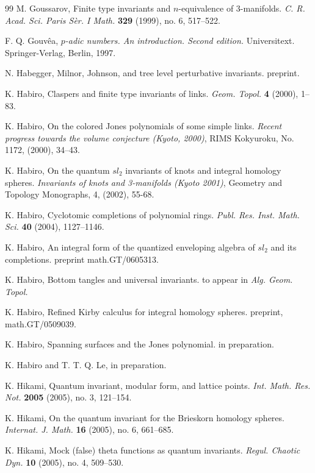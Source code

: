 \documentclass{amsart}
\numberwithin{equation}{section}
\numberwithin{figure}{section}
\theoremstyle{plain}
\theoremstyle{definition}
\theoremstyle{remark}
\begin{document}
\begin{thebibliography}{99}
M. Goussarov,
Finite type invariants and $n$-equivalence of $3$-manifolds.
{\it C. R. Acad. Sci. Paris S\`er. I Math.} {\bf 329} (1999), no. 6, 517--522.

F. Q. Gouv\^ea,
{\it $p$-adic numbers. An introduction. Second edition.}
Universitext. Springer-Verlag, Berlin, 1997.

N. Habegger,
Milnor, Johnson, and tree level perturbative invariants.
preprint.

K. Habiro,
Claspers and finite type invariants of links.
{\it Geom. Topol.} {\bf 4} (2000), 1--83.

K. Habiro,
On the colored Jones polynomials of some simple links.
{\it Recent progress towards the volume conjecture (Kyoto, 2000)},
RIMS Kokyuroku, No. 1172, (2000), 34--43.

K. Habiro,
On the quantum $sl_2$ invariants of knots and integral homology spheres.
{\it Invariants of knots and 3-manifolds (Kyoto 2001)},
Geometry and Topology Monographs, 4, (2002), 55-68.

K. Habiro,
Cyclotomic completions of polynomial rings.
{\it Publ. Res. Inst. Math. Sci.} {\bf 40} (2004), 1127--1146.

K. Habiro,
An integral form of the quantized enveloping algebra of $sl_2$ and its
completions.  preprint math.GT/0605313.
%

K. Habiro,
Bottom tangles and universal invariants.
to appear in {\it Alg. Geom. Topol.}

K. Habiro,
Refined Kirby calculus for integral homology spheres.
preprint, math.GT/0509039.

K. Habiro,
Spanning surfaces and the Jones polynomial.
in preparation.

K. Habiro and T. T. Q. Le,
in preparation.

K. Hikami, Quantum invariant, modular form, and lattice points.
{\it Int. Math. Res. Not.} {\bf 2005} (2005),  no. 3, 121--154.

K. Hikami,
On the quantum invariant for the Brieskorn homology spheres.
{\it Internat. J. Math.} {\bf 16} (2005), no. 6, 661--685.

K. Hikami,
Mock (false) theta functions as quantum invariants.
{\it Regul. Chaotic Dyn.} {\bf 10}  (2005), no. 4, 509--530.


\end{thebibliography}
\end{document}
